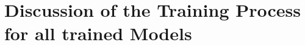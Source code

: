 \newpage

\section{Discussion of the Training Process for all trained Models}
















\newpage
